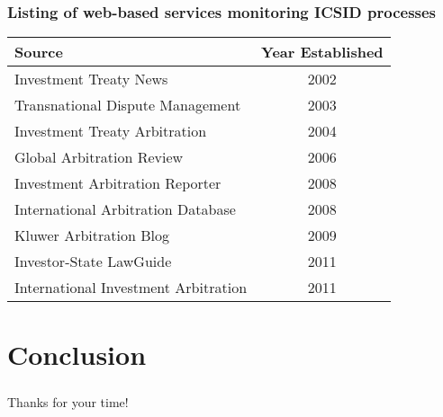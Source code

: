 \documentclass[10pt]{beamer}
\begin{document}
\begin{frame}
\frametitle{Listing of web-based services monitoring ICSID processes}

\begin{table}[ht]
\centering
\begin{tabular}{lc}
	\hline\hline
	Source & Year Established \\
	\hline
	Investment Treaty News & 2002 \\
	Transnational Dispute Management & 2003 \\
	Investment Treaty Arbitration & 2004 \\
	Global Arbitration Review & 2006 \\
	Investment Arbitration Reporter & 2008 \\
	International Arbitration Database & 2008 \\
	Kluwer Arbitration Blog & 2009 \\
	Investor-State LawGuide & 2011 \\
	International Investment Arbitration & 2011 \\
	\hline\hline
\end{tabular}
\end{table}

\end{frame}


\section{Conclusion}

\begin{frame}
\frametitle{}

\begin{center}
Thanks for your time!
\end{center}

\end{frame}
\end{document}
